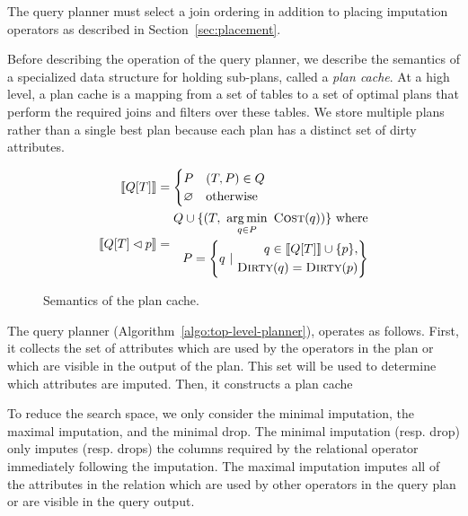 The query planner must select a join ordering in addition to placing imputation operators as described in Section~\ref{sec:placement}.

Before describing the operation of the query planner, we describe the semantics of a specialized data structure for holding sub-plans, called a \emph{plan cache}.
At a high level, a plan cache is a mapping from a set of tables to a set of optimal plans that perform the required joins and filters over these tables.
We store multiple plans rather than a single best plan because each plan has a distinct set of dirty attributes.

\begin{figure}
  \begin{align*}
    \llbracket Q[T] \rrbracket &= \begin{cases}
      P & (T, P) \in Q \\
      \varnothing & \text{otherwise} \\
    \end{cases} \\
    \llbracket Q[T] \lhd p \rrbracket &= \begin{aligned}
                                           Q \cup \{(T,\ \operatorname*{arg\,min}_{q \in P}\ \textsc{Cost}(q))\}\ \text{where} \\
                                           P = \left\{q ~|~ \begin{aligned}
                                                                     q \in \llbracket Q[T] \rrbracket \cup \{p\}, \\
                                                                     \textsc{Dirty}(q) = \textsc{Dirty}(p) 
                                                                   \end{aligned}
                                           \right\}
                                         \end{aligned}
  \end{align*}
  \caption{Semantics of the plan cache.}
\end{figure}

The query planner (Algorithm~\ref{algo:top-level-planner}), operates as follows.
First, it collects the set of attributes which are used by the operators in the plan or which are visible in the output of the plan.
This set will be used to determine which attributes are imputed.
Then, it constructs a plan cache 

To reduce the search space, we only consider the minimal imputation, the maximal imputation, and the minimal drop. The minimal imputation (resp. drop) only imputes (resp. drops) the columns required by the relational operator immediately following the imputation. The maximal imputation imputes all of the attributes in the relation which are used by other operators in the query plan or are visible in the query output.

